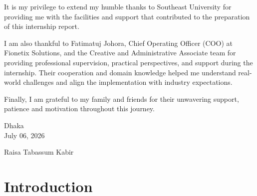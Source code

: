 \documentclass[12pt,a4paper]{report}
\renewcommand{\headrulewidth}{0pt}
\renewcommand{\footrulewidth}{0pt}
\begin{document}
It is my privilege to extend my humble thanks to Southeast University for providing me with the facilities and support that contributed to the preparation of this internship report.

I am also thankful to Fatimatuj Johora, Chief Operating Officer (COO) at Fionetix Solutions, and the Creative and Administrative Associate team for providing professional supervision, practical perspectives, and support during the internship. Their cooperation and domain knowledge helped me understand real-world challenges and align the implementation with industry expectations.

Finally, I am grateful to my family and friends for their unwavering support, patience and motivation throughout this journey.

\vspace{2cm}
\noindent
\begin{minipage}[t]{0.45\textwidth}
Dhaka\\
July 06, 2026
\end{minipage}
\hfill
\begin{minipage}[t]{0.45\textwidth}
\raggedleft
Raisa Tabassum Kabir
\end{minipage}

\newpage
\tableofcontents
\newpage
{}
\listoffigures
\newpage
{}
\listoftables

\newpage
{}

\fancypagestyle{plain}{
  \fancyhf{}
  \fancyhead[R]{\thepage}
  \renewcommand{\headrulewidth}{0.4pt}
  \renewcommand{\footrulewidth}{0pt}
}

\pagestyle{fancy}
\fancyhf{}
\renewcommand{\sectionmark}[1]{\markright{\MakeUppercase{\thesection.\ #1}}}
\fancyhead[L]{\nouppercase{\rightmark}}
\fancyhead[R]{\thepage}
\renewcommand{\headrulewidth}{0.4pt}
\renewcommand{\footrulewidth}{0pt}

\chapter{Introduction}
\end{document}
